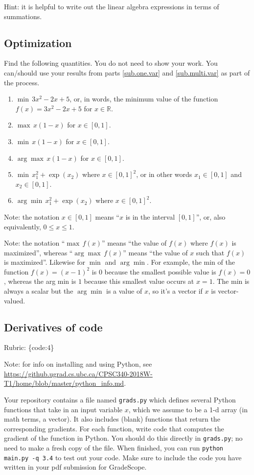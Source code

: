 \documentclass{article}
\def\rubric#1{\gre{Rubric: \{#1\}}}{}
\def\blu#1{{\color{blu}#1}}
\def\gre#1{{\color{gre}#1}}
\def\R{\mathbb{R}}
\begin{document}
Hint: it is helpful to write out the linear algebra expressions in terms of summations.


\subsection{Optimization}
\blu{Find the following quantities.} You do not need to show your work. 
You can/should use your results from parts \ref{sub.one.var} and \ref{sub.multi.var} as part of the process.

\begin{enumerate}
\item $\min \, 3x^2-2x+5$, or, in words, the minimum value of the function $f(x) = 3x^2 -2x + 5$ for $x \in \R$.
\item $\max \, x(1-x)$ for $x\in [0,1]$.
\item $\min \, x(1-x)$ for $x\in [0,1]$.
\item $\arg \max \, x(1-x)$ for $x\in[0,1]$. 
\item $\min \, x_1^2 + \exp(x_2)$ where $x \in [0,1]^2$, or in other words $x_1\in [0,1]$ and $x_2\in [0,1]$.
\item $\arg \min \, x_1^2 + \exp(x_2)$ where $x \in [0,1]^2$. 
\end{enumerate}

Note: the notation $x\in [0,1]$ means ``$x$ is in the interval $[0,1]$'', or, also equivalently, $0 \leq x \leq 1$.

Note: the notation ``$\max \, f(x)$'' means ``the value of $f(x)$ where $f(x)$ is maximized'', whereas ``$\arg \max \, f(x)$'' means ``the value of $x$ such that $f(x)$ is maximized''.
Likewise for $\min$ and $\arg \min$. For example, the min of the function $f(x)=(x-1)^2$ is $0$ because the smallest possible value is $f(x)=0$, 
whereas the arg min is $1$ because this smallest value occurs at $x=1$. The min is always a scalar but the $\arg \min$ is a value of $x$, so it's a vector 
if $x$ is vector-valued.

\subsection{Derivatives of code}

\rubric{code:4}

Note: for info on installing and using Python, see \\\url{https://github.ugrad.cs.ubc.ca/CPSC340-2018W-T1/home/blob/master/python_info.md}.

Your repository contains a file named \texttt{grads.py} which defines several Python functions that take in an input variable $x$, which we assume to be a 1-d array (in math terms, a vector).
It also includes (blank) functions that return the corresponding gradients.
For each function, \blu{write code that computes the gradient of the function} in Python.
You should do this directly in \texttt{grads.py}; no need to make a fresh copy of the file. When finished, you can run \texttt{python main.py -q 3.4} to test out your code. Make sure to include the code you have written in your pdf submission for GradeScope.
\end{document}
